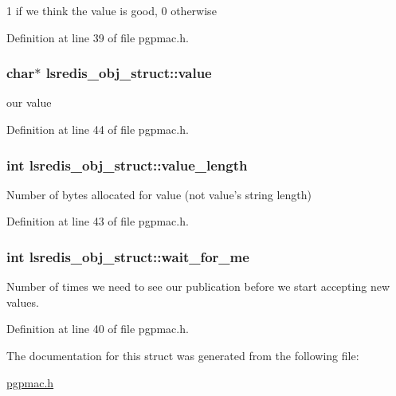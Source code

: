 1 if we think the value is good, 0 otherwise 



Definition at line 39 of file pgpmac.\-h.

\hypertarget{structlsredis__obj__struct_a0465c65288e8101805a6f91049164517}{
\subsubsection[{value}]{\setlength{\rightskip}{0pt plus 5cm}char$\ast$ lsredis\-\_\-obj\-\_\-struct\-::value}}\label{structlsredis__obj__struct_a0465c65288e8101805a6f91049164517}


our value 



Definition at line 44 of file pgpmac.\-h.

\hypertarget{structlsredis__obj__struct_a664f0eaafb8dffc0dbde126e0340efb9}{
\subsubsection[{value\-\_\-length}]{\setlength{\rightskip}{0pt plus 5cm}int lsredis\-\_\-obj\-\_\-struct\-::value\-\_\-length}}\label{structlsredis__obj__struct_a664f0eaafb8dffc0dbde126e0340efb9}


Number of bytes allocated for value (not value's string length) 



Definition at line 43 of file pgpmac.\-h.

\hypertarget{structlsredis__obj__struct_a8bc1a536b7155a1e2a749c7c434b898b}{
\subsubsection[{wait\-\_\-for\-\_\-me}]{\setlength{\rightskip}{0pt plus 5cm}int lsredis\-\_\-obj\-\_\-struct\-::wait\-\_\-for\-\_\-me}}\label{structlsredis__obj__struct_a8bc1a536b7155a1e2a749c7c434b898b}


Number of times we need to see our publication before we start accepting new values. 



Definition at line 40 of file pgpmac.\-h.



The documentation for this struct was generated from the following file\-:\begin{DoxyCompactItemize}
\item 
\hyperlink{pgpmac_8h}{pgpmac.\-h}\end{DoxyCompactItemize}
